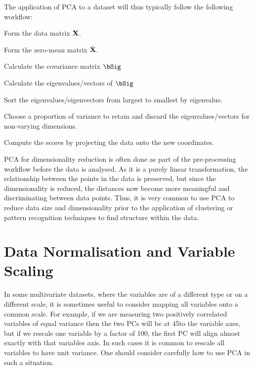\documentclass[12pt,a4paper]{tufte-handout}
\begin{document}
The application of PCA to a dataset will thus typically follow the following workflow:
\begin{asparaenum}
  \item Form the data matrix $\mathbf{X}$.
  \item Form the zero-mean matrix $\tilde {\mathbf{X}}$.
  \item Calculate the covariance matrix $\bSig$
  \item Calculate the eigenvalues/vectors of $\bSig$
  \item Sort the eigenvalues/eigenvectors from largest to smallest by eigenvalue.
  \item Choose a proportion of variance to retain and discard the eigenvalues/vectors for non-varying dimensions.
  \item Compute the scores by projecting the data onto the new coordinates.
\end{asparaenum}

PCA for dimensionality reduction is often done as part of the pre-processing workflow before the data is analysed. As it is a purely linear transformation, the relationship between the points in the data is preserved, but since the dimensionality is reduced, the distances now become more meaningful and discriminating between data points. Thus, it is very common to use PCA to reduce data size and dimensionality prior to the application of clustering or pattern recognition techniques to find structure within the data.

\section{Data Normalisation and Variable Scaling}

In some multivariate datasets, where the variables are of a different type or on a different scale, it is sometimes useful to consider mapping all variables onto a common scale. For example, if we are measuring two positively correlated variables of equal variance then the two PCs will be at 45\degree to the variable axes, but if we rescale one variable by a factor of 100, the first PC will align almost exactly with that variables axis. In such cases it is common to rescale all variables to have unit variance. One should consider carefully how to use PCA in such a situation.
\end{document}
